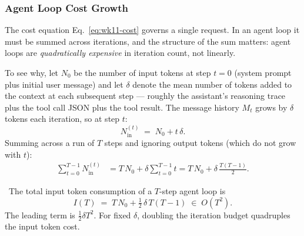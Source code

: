 \subsubsection{Agent Loop Cost Growth}

The cost equation Eq.~\eqref{eq:wk11-cost} governs a single
request. In an agent loop it must be summed across iterations,
and the structure of the sum matters: agent loops are
\emph{quadratically expensive} in iteration count, not linearly.

To see why, let $N_0$ be the number of input tokens at step
$t=0$ (system prompt plus initial user message) and let $\delta$
denote the mean number of tokens added to the context at each
subsequent step --- roughly the assistant's reasoning trace plus
the tool call JSON plus the tool result. The message history
$M_t$ grows by $\delta$ tokens each iteration, so at step $t$:
\begin{equation}
  N_\mathrm{in}^{(t)} \;=\; N_0 + t\,\delta.
  \label{eq:wk11-context-growth}
\end{equation}
Summing across a run of $T$ steps and ignoring output tokens
(which do not grow with $t$):
\begin{align}
  \sum_{t=0}^{T-1} N_\mathrm{in}^{(t)}
  &= T\,N_0 + \delta\sum_{t=0}^{T-1}t
   = T\,N_0 + \delta\,\frac{T(T-1)}{2}.
  \label{eq:wk11-loop-input-total}
\end{align}

\Ident\ The total input token consumption of a $T$-step agent
loop is
\begin{equation}
  I(T) \;=\; T\,N_0 + \tfrac{1}{2}\,\delta\,T(T-1)
            \;\in\; O(T^2).
  \label{eq:wk11-quadratic-cost}
\end{equation}
The leading term is $\tfrac{1}{2}\delta T^2$. For fixed $\delta$,
doubling the iteration budget quadruples the input token cost.


